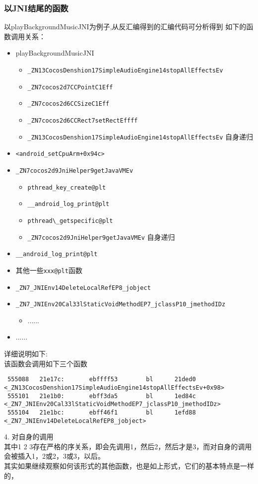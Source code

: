 \subsubsection{以JNI结尾的函数}
以playBackgroundMusicJNI为例子,从反汇编得到的汇编代码可分析得到
如下的函数调用关系：
\begin{itemize}
\item playBackgroundMusicJNI
  \begin{itemize}
  \item \verb|_ZN13CocosDenshion17SimpleAudioEngine14stopAllEffectsEv|
  \item \verb|_ZN7cocos2d7CCPointC1Eff|
  \item \verb|_ZN7cocos2d6CCSizeC1Eff|
  \item \verb|_ZN7cocos2d6CCRect7setRectEffff|
  \item \verb|_ZN13CocosDenshion17SimpleAudioEngine14stopAllEffectsEv| 
	自身递归
  \end{itemize}
\item \verb|<android_setCpuArm+0x94c>|
\item \verb|_ZN7cocos2d9JniHelper9getJavaVMEv|
  \begin{itemize}
  \item \verb|pthread_key_create@plt|
  \item \verb|__android_log_print@plt|
  \item \verb|pthread\_getspecific@plt|
  \item \verb|_ZN7cocos2d9JniHelper9getJavaVMEv| 自身递归
  \end{itemize}
\item \verb|__android_log_print@plt|
\item 其他一些\verb|xxx@plt|函数
\item \verb|_ZN7_JNIEnv14DeleteLocalRefEP8_jobject|
\item \verb|_ZN7_JNIEnv20Cal33lStaticVoidMethodEP7_jclassP10_jmethodIDz|
  \begin{itemize}
  \item ......
  \end{itemize}
\item ......
\end{itemize}
详细说明如下:\\
该函数会调用如下三个函数\\
\begin{lstlisting}
 555088   21e17c:       ebffff53        bl      21ded0 <_ZN13CocosDenshion17SimpleAudioEngine14stopAllEffectsEv+0x98>
 555101   21e1b0:       ebff3da5        bl      1ed84c <_ZN7_JNIEnv20Cal33lStaticVoidMethodEP7_jclassP10_jmethodIDz>
 555104   21e1bc:       ebff46f1        bl      1efd88 <_ZN7_JNIEnv14DeleteLocalRefEP8_jobject>
\end{lstlisting}
 4.  对自身的调用\\
其中1 2 3存在严格的序关系，即会先调用1，然后2，然后才是3，而对自身的调用会被插入1，2或2，3或3，以后。\\
其实如果继续观察如何该形式的其他函数，也是如上形式，它们的基本特点是一样的，\\



